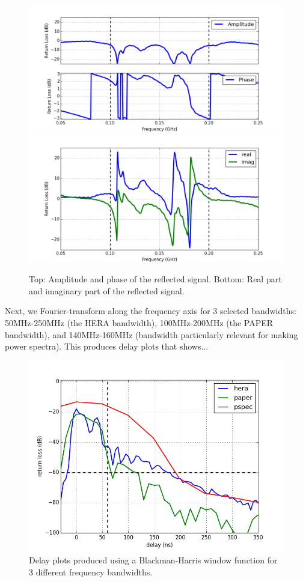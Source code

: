\documentclass[12pt,preprint]{aastex}
\begin{document}
\begin{figure}
\centering
\includegraphics[totalheight=0.4\textheight]{plots/frequency_amp_phase.png}
\includegraphics[totalheight=0.4\textheight]{plots/frequency_real_imag.png}
\caption{Top: Amplitude and phase of the reflected signal. Bottom: Real part and imaginary part of the reflected signal.}
\end{figure}

Next, we Fourier-transform along the frequency axis for 3 selected bandwidths: 50MHz-250MHz (the HERA bandwidth), 100MHz-200MHz (the PAPER bandwidth), and 140MHz-160MHz (bandwidth particularly relevant for making power spectra). This produces delay plots that shows...

\begin{figure}
\centering
\includegraphics[totalheight=0.5\textheight]{plots/delay3_window.png}
\caption{Delay plots produced using a Blackman-Harris window function for 3 different frequency bandwidths.}
\end{figure}
\end{document}
